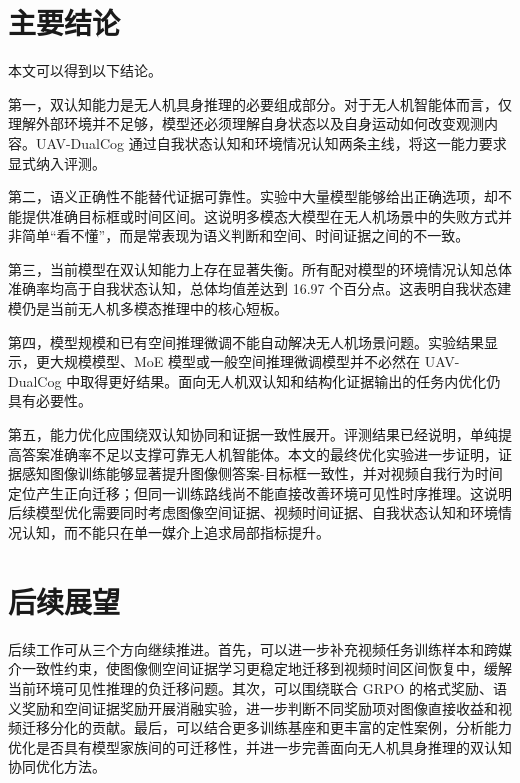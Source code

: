 \section{主要结论}

本文可以得到以下结论。

第一，双认知能力是无人机具身推理的必要组成部分。对于无人机智能体而言，仅理解外部环境并不足够，模型还必须理解自身状态以及自身运动如何改变观测内容。UAV-DualCog 通过自我状态认知和环境情况认知两条主线，将这一能力要求显式纳入评测。

第二，语义正确性不能替代证据可靠性。实验中大量模型能够给出正确选项，却不能提供准确目标框或时间区间。这说明多模态大模型在无人机场景中的失败方式并非简单“看不懂”，而是常表现为语义判断和空间、时间证据之间的不一致。

第三，当前模型在双认知能力上存在显著失衡。所有配对模型的环境情况认知总体准确率均高于自我状态认知，总体均值差达到 16.97 个百分点。这表明自我状态建模仍是当前无人机多模态推理中的核心短板。

第四，模型规模和已有空间推理微调不能自动解决无人机场景问题。实验结果显示，更大规模模型、MoE 模型或一般空间推理微调模型并不必然在 UAV-DualCog 中取得更好结果。面向无人机双认知和结构化证据输出的任务内优化仍具有必要性。

第五，能力优化应围绕双认知协同和证据一致性展开。评测结果已经说明，单纯提高答案准确率不足以支撑可靠无人机智能体。本文的最终优化实验进一步证明，证据感知图像训练能够显著提升图像侧答案-目标框一致性，并对视频自我行为时间定位产生正向迁移；但同一训练路线尚不能直接改善环境可见性时序推理。这说明后续模型优化需要同时考虑图像空间证据、视频时间证据、自我状态认知和环境情况认知，而不能只在单一媒介上追求局部指标提升。

\section{后续展望}

后续工作可从三个方向继续推进。首先，可以进一步补充视频任务训练样本和跨媒介一致性约束，使图像侧空间证据学习更稳定地迁移到视频时间区间恢复中，缓解当前环境可见性推理的负迁移问题。其次，可以围绕联合 GRPO 的格式奖励、语义奖励和空间证据奖励开展消融实验，进一步判断不同奖励项对图像直接收益和视频迁移分化的贡献。最后，可以结合更多训练基座和更丰富的定性案例，分析能力优化是否具有模型家族间的可迁移性，并进一步完善面向无人机具身推理的双认知协同优化方法。
